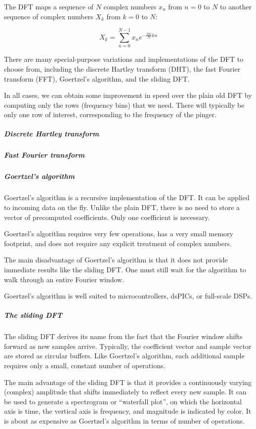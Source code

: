 \documentclass[10pt]{article}
\begin{document}
The DFT maps a sequence of \(N\) complex numbers \(x_n\) from \(n=0\) to \(N\) to another sequence of complex numbers \(X_k\) from \(k=0\) to \(N\):

\begin{equation}
X_k=\sum_{n=0}^{N-1} {x_n e^{- \frac{2 \pi i}{N} kn}}
\end{equation}

There are many special-purpose variations and implementations of the DFT to choose from, including the discrete Hartley transform (DHT), the fast Fourier transform (FFT), Goertzel's algorithm, and the sliding DFT.

In all cases, we can obtain some improvement in speed over the plain old DFT by computing only the rows (frequency bins) that we need.  There will typically be only one row of interest, corresponding to the frequency of the pinger.

\subparagraph{Discrete Hartley transform}

\subparagraph{Fast Fourier transform}

\subparagraph{Goertzel's  algorithm}

Goertzel's algorithm is a recursive implementation of the DFT.   It can be applied to incoming data on the fly.  Unlike the plain DFT, there is no need to store a vector of precomputed coefficients.  Only one coefficient is necessary.

Goertzel's algorithm requires very few operations, has a very small memory footprint, and does not require any explicit treatment of complex numbers.

The main disadvantage of Goertzel's algorithm is that it does not provide immediate results like the sliding DFT.  One must still wait for the algorithm to walk through an entire Fourier window.

Goertzel's algorithm is well suited to microcontrollers, dsPICs, or full-scale DSPs.

\subparagraph{The sliding DFT}

The sliding DFT derives its name from the fact that the Fourier window shifts forward as new samples arrive.  Typically, the coefficient vector and sample vector are stored as circular buffers.  Like Goertzel's algorithm, each additional sample requires only a small, constant number of operations.

The main advantage of the sliding DFT is that it provides a continuously varying (complex) amplitude that shifts immediately to reflect every new sample.  It can be used to generate a spectrogram or ``waterfall plot'', on which the horizontal axis is time, the vertical axis is frequency, and magnitude is indicated by color.  It is about as expensive as Goertzel's algorithm in terms of number of operations.
\end{document}
